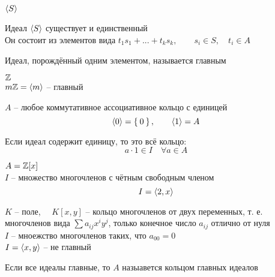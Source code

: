\begin{notation}
	$ \Braket{S} $
\end{notation}

\begin{props}
	\item Идеал $ \Braket{S} $ существует и единственный \\
	Он состоит из элементов вида $ t_1s_1 + ... + t_ks_k, \qquad s_i \in S, \quad t_i \in A $
\end{props}

\begin{definition}
	Идеал, порождённый одним элементом, называется главным
\end{definition}

\begin{exmpls}
	\item $ \mathbb{Z} $ \\
	$ m\mathbb{Z} = \Braket{m} $ -- главный
	\item $ A $ -- любое коммутативное ассоциативное кольцо с единицей
	$$ \Braket{0} = \Set{0}, \qquad \Braket{1} = A $$
	\begin{remark}
		Если идеал содержит единицу, то это всё кольцо:
		$$ a \cdot 1 \in I \quad \forall a \in A $$
	\end{remark}
	\item $ A = \mathbb{Z}[x] $ \\
	$ I $ -- множество многочленов с чётным свободным членом
	$$ I = \Braket{2, x} $$
	\item $ K $ -- поле, $ \quad K[x, y] $ -- кольцо многочленов от двух переменных, т. е. многочленов вида $ \sum a_{ij}x^iy^j $, только конечное число $ a_{ij} $ отлично от нуля \\
	$ I $ -- мноежство многочленов таких, что $ a_{00} = 0 $ \\
	$ I = \Braket{x, y} $ -- не главный
\end{exmpls}

\begin{definition}
	Если все идеалы главные, то $ A $ назыавется кольцом главных идеалов
\end{definition}

